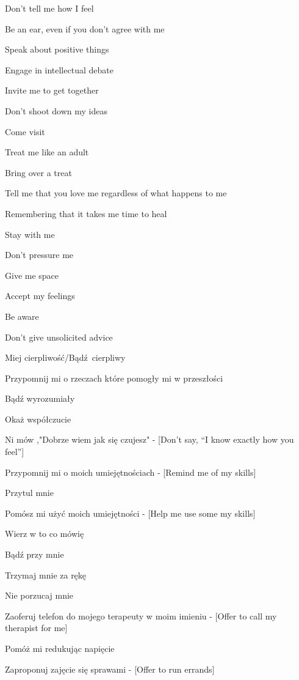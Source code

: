 \begin{multicols}{2}
\begin{checkboxlist}
\item Don’t tell me how I feel
\item Be an ear, even if you don’t agree with me
\item Speak about positive things
\item Engage in intellectual debate
\item Invite me to get together
\item Don’t shoot down my ideas
\item Come visit
\item Treat me like an adult
\item Bring over a treat
\item Tell me that you love me regardless of what happens to me
\item Remembering that it takes me time to heal
\item Stay with me
\item Don’t pressure me
\item Give me space
\item Accept my feelings
\item Be aware
\item Don’t give unsolicited advice
\item Miej cierpliwość/Bądź cierpliwy
\item Przypomnij mi o rzeczach które pomogły mi w przeszłości
\item Bądź wyrozumiały
\item Okaż współczucie
\item Ni mów ,"Dobrze wiem jak się czujesz" - [Don’t say, “I know exactly how you feel”]
\item Przypomnij mi o moich umiejętnościach - [Remind me of my skills]
\item Przytul mnie
\item Pomósz mi użyć moich umiejętności - [Help me use some my skills]
\item Wierz w to co mówię
\item Bądź przy mnie
\item Trzymaj mnie za rękę
\item Nie porzucaj mnie
\item Zaoferuj telefon do mojego terapeuty w moim imieniu - [Offer to call my therapist for me]
\item Pomóż mi redukując napięcie
\item Zaproponuj zajęcie się sprawami - [Offer to run errands]
\end{checkboxlist}
\end{multicols}

